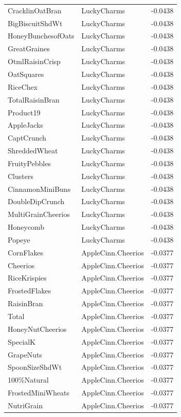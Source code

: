 \begin{table}[!htbp]
\begin{tabular}{lll}
CracklinOatBran & LuckyCharms & -0.0438
\\
BigBiscuitShdWt & LuckyCharms & -0.0438
\\
HoneyBunchesofOats & LuckyCharms & -0.0438
\\
GreatGraines & LuckyCharms & -0.0438
\\
OtmlRaisinCrisp & LuckyCharms & -0.0438
\\
OatSquares & LuckyCharms & -0.0438
\\
RiceChex & LuckyCharms & -0.0438
\\
TotalRaisinBran & LuckyCharms & -0.0438
\\
Product19 & LuckyCharms & -0.0438
\\
AppleJacks & LuckyCharms & -0.0438
\\
CaptCrunch & LuckyCharms & -0.0438
\\
ShreddedWheat & LuckyCharms & -0.0438
\\
FruityPebbles & LuckyCharms & -0.0438
\\
Clusters & LuckyCharms & -0.0438
\\
CinnamonMiniBuns & LuckyCharms & -0.0438
\\
DoubleDipCrunch & LuckyCharms & -0.0438
\\
MultiGrainCheerios & LuckyCharms & -0.0438
\\
Honeycomb & LuckyCharms & -0.0438
\\
Popeye & LuckyCharms & -0.0438
\\
CornFlakes & AppleCinn.Cheerios & -0.0377
\\
Cheerios & AppleCinn.Cheerios & -0.0377
\\
RiceKrispies & AppleCinn.Cheerios & -0.0377
\\
FrostedFlakes & AppleCinn.Cheerios & -0.0377
\\
RaisinBran & AppleCinn.Cheerios & -0.0377
\\
Total & AppleCinn.Cheerios & -0.0377
\\
HoneyNutCheerios & AppleCinn.Cheerios & -0.0377
\\
SpecialK & AppleCinn.Cheerios & -0.0377
\\
GrapeNuts & AppleCinn.Cheerios & -0.0377
\\
SpoonSizeShdWt & AppleCinn.Cheerios & -0.0377
\\
100\%Natural & AppleCinn.Cheerios & -0.0377
\\
FrostedMiniWheats & AppleCinn.Cheerios & -0.0377
\\
NutriGrain & AppleCinn.Cheerios & -0.0377

\end{tabular}
\end{table}
